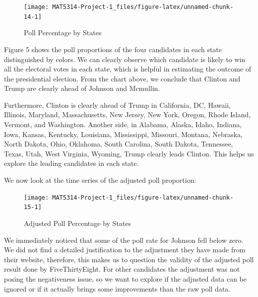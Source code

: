 \documentclass[
  12pt,
]{article}
\begin{document}
\begin{minipage}[t]{0.7\textwidth}
\begin{figure}
\texttt{[image: MAT5314-Project-1\_files/figure-latex/unnamed-chunk-14-1]} \caption{Poll Percentage by States}\label{fig:unnamed-chunk-14}
\end{figure}
\end{minipage}
\begin{minipage}[t]{0.3\textwidth}
\vspace{0pt}
Figure 5 shows the poll proportions of the four candidates in each state distinguished by colors. We can clearly observe which candidate is likely to win all the electoral votes in each state, which is helpful in estimating the outcome of the presidential election. From the chart above, we conclude that Clinton and Trump are clearly ahead of Johnson and Mcmullin. 
\end{minipage}

Furthermore, Clinton is clearly ahead of Trump in California, DC,
Hawaii, Illinois, Maryland, Massachusetts, New Jersey, New York, Oregon,
Rhode Island, Vermont, and Washington. Another side, in Alabama, Alaska,
Idaho, Indiana, Iowa, Kansas, Kentucky, Louisiana, Mississippi,
Missouri, Montana, Nebraska, North Dakota, Ohio, Oklahoma, South
Carolina, South Dakota, Tennessee, Texas, Utah, West Virginia, Wyoming,
Trump clearly leads Clinton. This helps us explore the leading
candidates in each state.

We now look at the time series of the adjusted poll proportion:

\begin{minipage}[t]{0.7\textwidth}
\begin{figure}
\texttt{[image: MAT5314-Project-1\_files/figure-latex/unnamed-chunk-15-1]} \caption{Adjusted Poll Percentage by States}\label{fig:unnamed-chunk-15}
\end{figure}
\end{minipage}
\begin{minipage}[t]{0.3\textwidth}
\vspace{0pt}
We immediately noticed that some of the poll rate for Johnson fell below zero. We did not find a detailed justification to the adjustment they have made from their website, therefore, this makes us to question the validity of the adjusted poll result done by FiveThirtyEight. For other candidates the adjustment was not posing the negativeness issue, so we want to explore if the adjusted data can be ignored or if it actually brings some improvements than the raw poll data.
\end{minipage}
\end{document}
